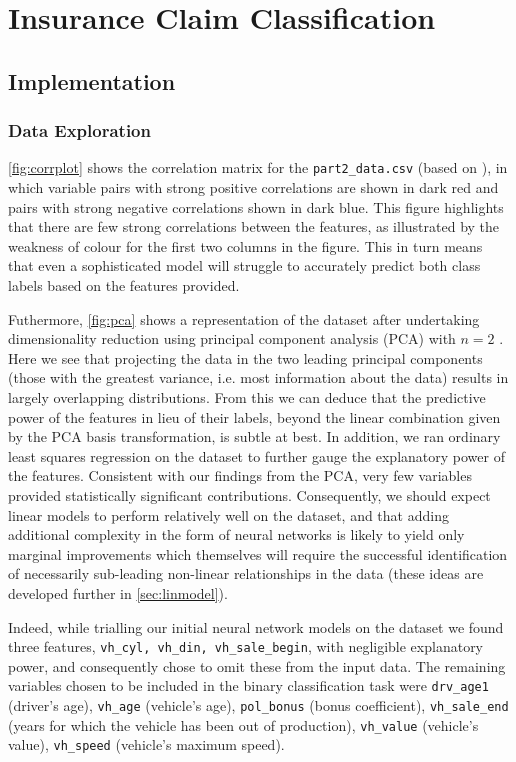\section{Insurance Claim Classification}

\subsection{Implementation}

\subsubsection*{Data Exploration} \label{section:explor}
\autoref{fig:corrplot} shows the correlation matrix for the \texttt{part2\_data.csv} (based on \cite{corr_plot}), in which variable pairs with strong positive correlations are shown in dark red and pairs with strong negative correlations shown in dark blue. This figure highlights that there are few strong correlations between the features, as illustrated by the weakness of colour for the first two columns in the figure. This in turn means that even a sophisticated model will struggle to accurately predict both class labels based on the features provided. 

Futhermore, \autoref{fig:pca} shows a representation of the dataset after undertaking dimensionality reduction using principal component analysis (PCA) with $n=2$ . Here we see that projecting the data in the two leading principal components (those with the greatest variance, i.e. most information about the data) results in largely overlapping distributions. From this we can deduce that the predictive power of the features in lieu of their labels, beyond the linear combination given by the PCA basis transformation, is subtle at best. In addition, we ran ordinary least squares regression on the dataset to further gauge the explanatory power of the features. Consistent with our findings from the PCA, very few variables provided statistically significant contributions. Consequently, we should expect linear models to perform relatively well on the dataset, and that adding additional complexity in the form of neural networks is likely to yield only marginal improvements which themselves will require the successful identification of necessarily sub-leading non-linear relationships in the data (these ideas are developed further in \autoref{sec:linmodel}).

Indeed, while trialling our initial neural network models on the dataset we found three features, \texttt{vh\_cyl, vh\_din, vh\_sale\_begin}, with negligible explanatory power, and consequently chose to omit these from the input data. The remaining variables chosen to be included in the binary classification task were \texttt{drv\_age1} (driver's age), \texttt{vh\_age} (vehicle's age), \texttt{pol\_bonus} (bonus coefficient), \texttt{vh\_sale\_end} (years for which the vehicle has been out of production), \texttt{vh\_value} (vehicle's value), \texttt{vh\_speed} (vehicle's maximum speed). 

